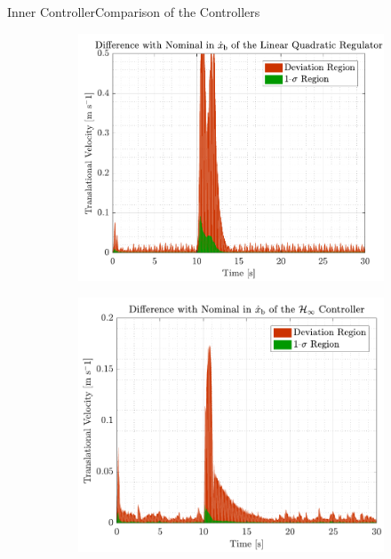 \begin{frame}{Inner Controller}{Comparison of the Controllers}
  \begin{figure}[H]
    \begin{minipage}{0.45\linewidth}
      \begin{figure}[H]
        \centering
        \includegraphics[width=1\linewidth]{figures/xbdot_mc_lqr_error}
      \end{figure}        
    \end{minipage}\hfill      
    \begin{minipage}{0.45\linewidth}
      \begin{figure}[H]
        \centering
        \includegraphics[width=1\linewidth]{figures/xbdot_mc_rob_error}
      \end{figure}                
    \end{minipage}\hfill \\
  \end{figure}
\end{frame}



